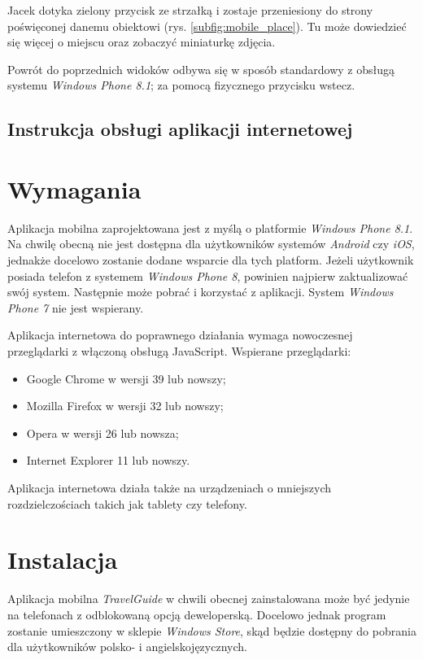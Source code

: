 \documentclass{book}
\newcommand{\appName}{\emph{TravelGuide} }
\begin{document}
		Jacek dotyka zielony przycisk ze strzałką i zostaje przeniesiony do strony poświęconej danemu obiektowi (rys. \ref{subfig:mobile_place}). Tu może dowiedzieć się więcej o miejscu oraz zobaczyć miniaturkę zdjęcia.
		
		Powrót do poprzednich widoków odbywa się w sposób standardowy z obsługą systemu \emph{Windows Phone 8.1}; za pomocą fizycznego przycisku wstecz. 		 

		\subsection{Instrukcja obsługi aplikacji internetowej}
		
		\section{Wymagania}
		
		Aplikacja mobilna zaprojektowana jest z myślą o platformie \emph{Windows Phone 8.1}. Na chwilę obecną nie jest dostępna dla użytkowników systemów \emph{Android} czy \emph{iOS}, jednakże docelowo zostanie dodane wsparcie dla tych platform. Jeżeli użytkownik posiada telefon z systemem \emph{Windows Phone 8}, powinien najpierw zaktualizować swój system. Następnie może pobrać i korzystać z aplikacji. System \emph{Windows Phone 7} nie jest wspierany.
		
		Aplikacja internetowa do poprawnego działania wymaga nowoczesnej przeglądarki z włączoną obsługą JavaScript. Wspierane przeglądarki:
		\begin{itemize}
			\item Google Chrome w wersji 39 lub nowszy;
			\item Mozilla Firefox w wersji 32 lub nowszy;
			\item Opera w wersji 26 lub nowsza;
			\item Internet Explorer 11 lub nowszy.
		\end{itemize}
		
		Aplikacja internetowa działa także na urządzeniach o mniejszych rozdzielczościach takich jak tablety czy telefony.
		
		\section{Instalacja}
		
		Aplikacja mobilna \appName w chwili obecnej zainstalowana może być jedynie na telefonach z odblokowaną opcją deweloperską. Docelowo jednak program zostanie umieszczony w sklepie \emph{Windows Store}, skąd będzie dostępny do pobrania dla użytkowników polsko- i angielskojęzycznych. 
		
\end{document}
